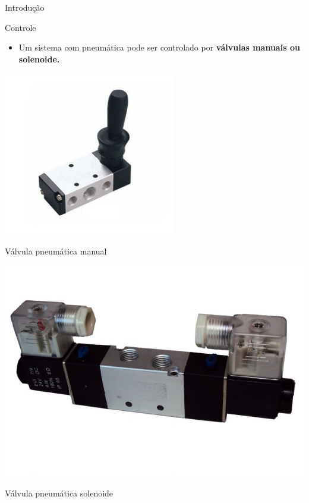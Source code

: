 \begin{frame}{Introdução}
\begin{block}{Controle}
	\begin{itemize}
		\item Um sistema com pneumática pode ser controlado por \textbf{válvulas manuais ou solenoide.}
	\end{itemize}
\end{block}

\begin{minipage}{0.45\linewidth}
	\centering
	\includegraphics[width=1\linewidth]{Figuras/Ch11/fig3}
	
	Válvula pneumática manual
\end{minipage}
\hfill
\begin{minipage}{0.45\linewidth}
	\centering
	\includegraphics[width=1\linewidth]{Figuras/Ch11/fig4}
	
	Válvula pneumática solenoide
\end{minipage}
\end{frame}


